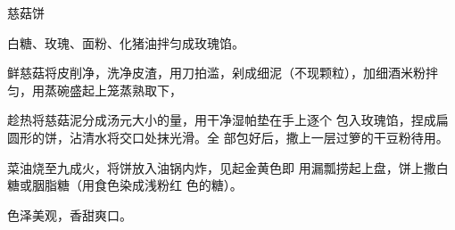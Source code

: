 \begin{recipe}{慈菇饼}

\ingredients


\cooking

\step 白糖、玫瑰、面粉、化猪油拌匀成玫瑰馅。

\step 鲜慈菇将皮削净，洗净皮渣，用刀拍滥，剁成细泥（不现颗粒），加细酒米粉拌匀，用蒸碗盛起上笼蒸熟取下，

趁热将慈菇泥分成汤元大小的量，用干净湿帕垫在手上逐个 包入玫瑰馅，捏成扁圆形的饼，沾清水将交口处抹光滑。全 部包好后，撒上一层过箩的干豆粉待用。

菜油烧至九成火，将饼放入油锅内炸，见起金黄色即 用漏瓢捞起上盘，饼上撒白糖或胭脂糖（用食色染成浅粉红 色的糖）。

\notes

色泽美观，香甜爽口。

\end{recipe}

